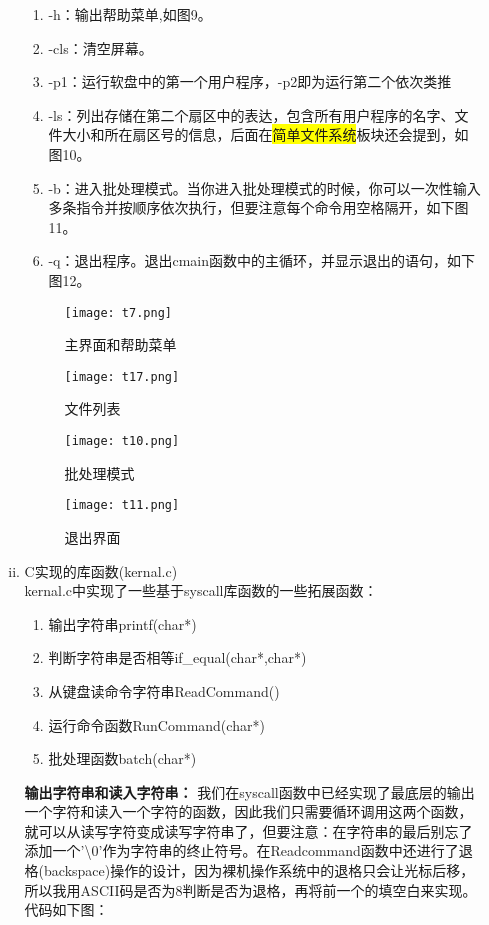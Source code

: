 \documentclass[UTF8]{article}
\begin{document}
\begin{enumerate}[1)]
\begin{enumerate}[i)]
		\begin{enumerate}[-]
		\item -h：输出帮助菜单,如图9。
		\item -cls：清空屏幕。
		\item -p1：运行软盘中的第一个用户程序，-p2即为运行第二个依次类推
		\item -ls：列出存储在第二个扇区中的表达，包含所有用户程序的名字、文件大小和所在扇区号的信息，后面在{\colorbox{yellow}{简单文件系统}}板块还会提到，如图10。
		\item -b：进入批处理模式。当你进入批处理模式的时候，你可以一次性输入多条指令并按顺序依次执行，但要注意每个命令用空格隔开，如下图11。
		\item -q：退出程序。退出cmain函数中的主循环，并显示退出的语句，如下图12。
		\end{enumerate}
		\begin{figure}[htbp]
			\begin{minipage}[t]{0.5\linewidth}
			\centering
			\texttt{[image: t7.png]}
			\caption{主界面和帮助菜单}
			\end{minipage}
			\begin{minipage}[t]{0.5\linewidth}
				\centering
			\texttt{[image: t17.png]}
			\caption{文件列表}
			\end{minipage}
		\end{figure}
		\newpage
		\begin{figure}[htbp]
			\centering
			\texttt{[image: t10.png]}
			\caption{批处理模式}
		\end{figure}	
		\begin{figure}[htbp]
			\centering
			\texttt{[image: t11.png]}
			\caption{退出界面}
		\end{figure} 
	\item C实现的库函数(kernal.c)
		{\\ kernal.c中实现了一些基于syscall库函数的一些拓展函数：}
		\begin{enumerate}[-]
		\item 输出字符串printf(char*)
		\item 判断字符串是否相等if\_equal(char*,char*)
		\item 从键盘读命令字符串ReadCommand()
		\item 运行命令函数RunCommand(char*)
		\item 批处理函数batch(char*)
		\end{enumerate}
		\vspace{0.2cm}
		{{\bfseries 输出字符串和读入字符串： }我们在syscall函数中已经实现了最底层的输出一个字符和读入一个字符的函数，因此我们只需要循环调用这两个函数，就可以从读写字符变成读写字符串了，但要注意：{\color{red}在字符串的最后别忘了添加一个'\textbackslash0'作为字符串的终止符号}。在Readcommand函数中还进行了{\color{red}退格(backspace)操作}的设计，因为裸机操作系统中的退格只会让光标后移，所以我用ASCII码是否为8判断是否为退格，再将前一个的填空白来实现。代码如下图：}

\end{enumerate}
\end{enumerate}
\end{document}
